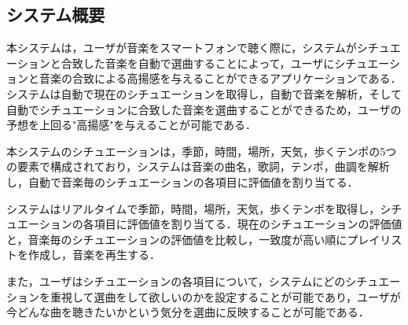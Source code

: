 \subsection{システム概要}
\par
本システムは，ユーザが音楽をスマートフォンで聴く際に，システムがシチュエーションと合致した音楽を自動で選曲することによって，ユーザにシチュエーションと音楽の合致による高揚感を与えることができるアプリケーションである．システムは自動で現在のシチュエーションを取得し，自動で音楽を解析，そして自動でシチュエーションに合致した音楽を選曲することができるため，ユーザの予想を上回る"高揚感"を与えることが可能である．
\par
本システムのシチュエーションは，季節，時間，場所，天気，歩くテンポの5つの要素で構成されており，システムは音楽の曲名，歌詞，テンポ，曲調を解析し，自動で音楽毎のシチュエーションの各項目に評価値を割り当てる．
\par
システムはリアルタイムで季節，時間，場所，天気，歩くテンポを取得し，シチュエーションの各項目に評価値を割り当てる．現在のシチュエーションの評価値と，音楽毎のシチュエーションの評価値を比較し，一致度が高い順にプレイリストを作成し，音楽を再生する．
\par
また，ユーザはシチュエーションの各項目について，システムにどのシチュエーションを重視して選曲をして欲しいのかを設定することが可能であり，ユーザが今どんな曲を聴きたいかという気分を選曲に反映することが可能である．
